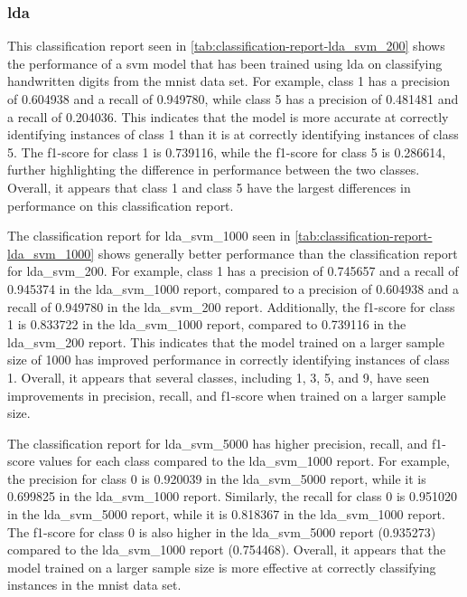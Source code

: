\subsubsection{\gls{lda}}\label{subsubsec:experiment_4_lda}




This classification report seen in \ref{tab:classification-report-lda_svm_200} shows the performance of a \gls{svm} model that has been trained using \gls{lda} on classifying handwritten digits from the \gls{mnist} data set. For example, class 1 has a precision of 0.604938 and a recall of 0.949780, while class 5 has a precision of 0.481481 and a recall of 0.204036. This indicates that the model is more accurate at correctly identifying instances of class 1 than it is at correctly identifying instances of class 5. The f1-score for class 1 is 0.739116, while the f1-score for class 5 is 0.286614, further highlighting the difference in performance between the two classes. Overall, it appears that class 1 and class 5 have the largest differences in performance on this classification report.



The classification report for lda\_svm\_1000 seen in \ref{tab:classification-report-lda_svm_1000} shows generally better performance than the classification report for lda\_svm\_200. For example, class 1 has a precision of 0.745657 and a recall of 0.945374 in the lda\_svm\_1000 report, compared to a precision of 0.604938 and a recall of 0.949780 in the lda\_svm\_200 report. Additionally, the f1-score for class 1 is 0.833722 in the lda\_svm\_1000 report, compared to 0.739116 in the lda\_svm\_200 report. This indicates that the model trained on a larger sample size of 1000 has improved performance in correctly identifying instances of class 1. Overall, it appears that several classes, including 1, 3, 5, and 9, have seen improvements in precision, recall, and f1-score when trained on a larger sample size.




The classification report for lda\_svm\_5000 has higher precision, recall, and f1-score values for each class compared to the lda\_svm\_1000 report. For example, the precision for class 0 is 0.920039 in the lda\_svm\_5000 report, while it is 0.699825 in the lda\_svm\_1000 report. Similarly, the recall for class 0 is 0.951020 in the lda\_svm\_5000 report, while it is 0.818367 in the lda\_svm\_1000 report. The f1-score for class 0 is also higher in the lda\_svm\_5000 report (0.935273) compared to the lda\_svm\_1000 report (0.754468). Overall, it appears that the model trained on a larger sample size is more effective at correctly classifying instances in the \gls{mnist} data set.


